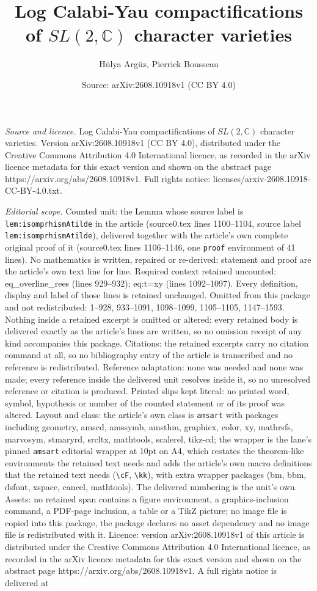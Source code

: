 \documentclass[10pt,a4paper]{amsart}
\title[Log Calabi-Yau compactifications of $SL(2,\mathbb{C})$ chara]{Log Calabi-Yau compactifications of $SL(2,\mathbb{C})$ character varieties}
\author{H\"ulya Arg\"uz, Pierrick Bousseau}
\date{Source: arXiv:2608.10918v1 (CC BY 4.0)}
\begin{document}
\maketitle

\noindent\emph{Source and licence.} Log Calabi-Yau compactifications of $SL(2,\mathbb{C})$ character varieties. Version arXiv:2608.10918v1 (CC BY 4.0), distributed under the Creative Commons Attribution 4.0 International licence, as recorded in the arXiv licence metadata for this exact version and shown on the abstract page https://arxiv.org/abs/2608.10918v1. Full rights notice: licenses/arxiv-2608.10918-CC-BY-4.0.txt.\par\smallskip

\noindent\textit{Editorial scope.} Counted unit: the Lemma whose source label is \texttt{lem:isomprhismAtilde} in the article (source0.tex lines 1100--1104, source label \texttt{lem:isomprhismAtilde}), delivered together with the article's own complete original proof of it (source0.tex lines 1106--1146, one \texttt{proof} environment of 41 lines). No mathematics is written, repaired or re-derived: statement and proof are the article's own text line for line. Required context retained uncounted: eq\_overline\_rees (lines 929--932); eq:t=xy (lines 1092--1097). Every definition, display and label of those lines is retained unchanged. Omitted from this package and not redistributed: 1--928, 933--1091, 1098--1099, 1105--1105, 1147--1593. Nothing inside a retained excerpt is omitted or altered: every retained body is delivered exactly as the article's lines are written, so no omission receipt of any kind accompanies this package. Citations: the retained excerpts carry no citation command at all, so no bibliography entry of the article is transcribed and no reference is redistributed. Reference adaptation: none was needed and none was made; every reference inside the delivered unit resolves inside it, so no unresolved reference or citation is produced. Printed slips kept literal: no printed word, symbol, hypothesis or number of the counted statement or of its proof was altered. Layout and class: the article's own class is \texttt{amsart} with packages including geometry, amscd, amssymb, amsthm, graphicx, color, xy, mathrsfs, marvosym, stmaryrd, srcltx, mathtools, scalerel, tikz-cd; the wrapper is the lane's pinned \texttt{amsart} editorial wrapper at 10pt on A4, which restates the theorem-like environments the retained text needs and adds the article's own macro definitions that the retained text needs (\texttt{\textbackslash cF}, \texttt{\textbackslash kk}), with extra wrapper packages (bm, bbm, dsfont, xspace, cancel, mathtools). The delivered numbering is the unit's own. Assets: no retained span contains a figure environment, a graphics-inclusion command, a PDF-page inclusion, a table or a TikZ picture; no image file is copied into this package, the package declares no asset dependency and no image file is redistributed with it. Licence: version arXiv:2608.10918v1 of this article is distributed under the Creative Commons Attribution 4.0 International licence, as recorded in the arXiv licence metadata for this exact version and shown on the abstract page https://arxiv.org/abs/2608.10918v1. A full rights notice is delivered at 
\end{document}

